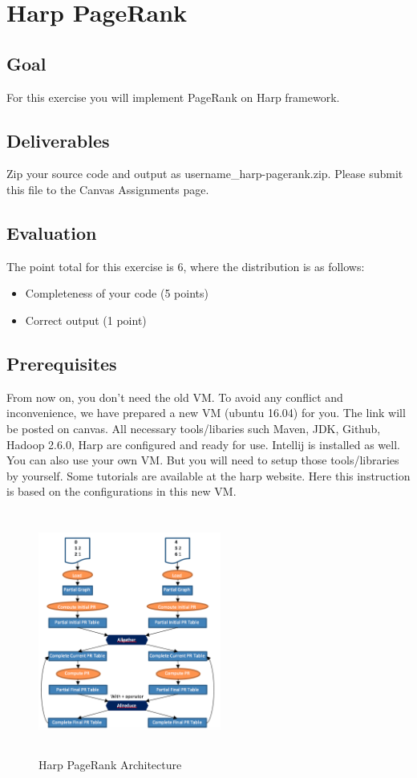 \section*{Harp PageRank}
\subsection*{Goal}
For this exercise you will implement PageRank on Harp framework.

\subsection*{Deliverables}
Zip your source code and output as username\_harp-pagerank.zip. Please submit
this file to the Canvas Assignments page.

\subsection*{Evaluation}
The point total for this exercise is 6, where the distribution is as follows:


\begin{itemize}
\item Completeness of your code (5 points)
\item Correct output (1 point)
\end{itemize}

\subsection*{Prerequisites}
From now on, you don't need the old VM. To avoid any conflict and
inconvenience, we have prepared a new VM (ubuntu 16.04) for you. The link will
be posted on canvas. All necessary tools/libaries such Maven, JDK, Github,
Hadoop 2.6.0, Harp are configured and ready for use. Intellij is installed as
well. You can also use your own VM. But you will need to setup those
tools/libraries by yourself. Some tutorials are available at the harp
website. Here this instruction is based on the configurations in
this new VM.

\begin{figure}[!htbp]
\includegraphics[width=6cm,height=8cm]{section/icloud/assignment/problems/project7/p8}
\centering
\caption{Harp PageRank Architecture}
\end{figure}

